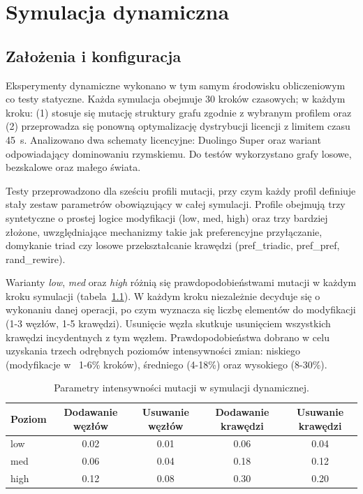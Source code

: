 \chapter{Symulacja dynamiczna}\label{chap:dynamic}

\section{Założenia i konfiguracja}

Eksperymenty dynamiczne wykonano w tym samym środowisku obliczeniowym co testy statyczne. Każda symulacja obejmuje 30 kroków czasowych; w każdym kroku: (1) stosuje się mutację struktury grafu zgodnie z wybranym profilem oraz (2) przeprowadza się ponowną optymalizację dystrybucji licencji z limitem czasu \SI{45}{\second}. Analizowano dwa schematy licencyjne: Duolingo Super oraz wariant odpowiadający dominowaniu rzymskiemu. Do testów wykorzystano grafy losowe, bezskalowe oraz małego świata.

Testy przeprowadzono dla sześciu profili mutacji, przy czym każdy profil definiuje stały zestaw parametrów obowiązujący w całej symulacji. Profile obejmują trzy syntetyczne o prostej logice modyfikacji (low, med, high) oraz trzy bardziej złożone, uwzględniające mechanizmy takie jak preferencyjne przyłączanie, domykanie triad czy losowe przekształcanie krawędzi (pref\_triadic, pref\_pref, rand\_rewire).

Warianty \emph{low}, \emph{med} oraz \emph{high} różnią się prawdopodobieństwami mutacji w każdym kroku symulacji (tabela~\ref{tab:dyn-mutation-levels}). W każdym kroku niezależnie decyduje się o wykonaniu danej operacji, po czym wyznacza się liczbę elementów do modyfikacji (1-3 węzłów, 1-5 krawędzi). Usunięcie węzła skutkuje usunięciem wszystkich krawędzi incydentnych z tym węzłem. Prawdopodobieństwa dobrano w celu uzyskania trzech odrębnych poziomów intensywności zmian: niskiego (modyfikacje w ~1-6\% kroków), średniego (4-18\%) oraz wysokiego (8-30\%).

\begin{table}[H]
  \centering
  \caption{Parametry intensywności mutacji w symulacji dynamicznej.}
  \label{tab:dyn-mutation-levels}
  \begin{tabular}{lcccc}
    \toprule
    \textbf{Poziom} & \textbf{Dodawanie węzłów} & \textbf{Usuwanie węzłów} & \textbf{Dodawanie krawędzi} & \textbf{Usuwanie krawędzi} \\
    \midrule
    low             & 0.02                      & 0.01                     & 0.06                        & 0.04                       \\
    med             & 0.06                      & 0.04                     & 0.18                        & 0.12                       \\
    high            & 0.12                      & 0.08                     & 0.30                        & 0.20                       \\
  \end{tabular}
\end{table}


